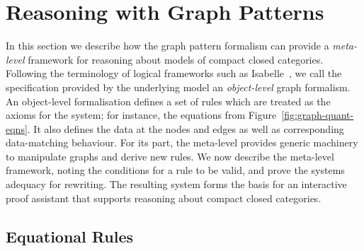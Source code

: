\documentclass[runningheads]{llncs}
\begin{document}






\section{Reasoning with Graph Patterns}
\label{sec:rewriting}

In this section we describe how the graph pattern formalism can
provide a \emph{meta-level} framework for reasoning about models of
compact closed categories. Following the terminology of logical
frameworks such as Isabelle~\cite{isabelle}, we call the specification
provided by the underlying model an \emph{object-level} graph
formalism. An object-level formalisation defines a set of rules which
are treated as the axioms for the system; for instance, the equations
from Figure~\ref{fig:graph-quant-eqns}. It also defines the data at
the nodes and edges as well as corresponding data-matching behaviour.
For its part, the meta-level provides generic machinery to manipulate
graphs and derive new rules.  We now describe the meta-level
framework, noting the conditions for a rule to be valid, and prove the
systems adequacy for rewriting. The resulting system forms the basis
for an interactive proof assistant that supports reasoning about
compact closed categories.

\subsection{Equational Rules}
\end{document}

